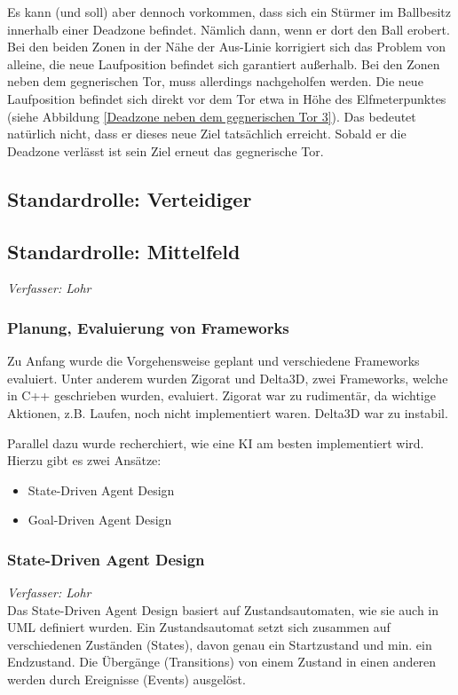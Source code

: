 \documentclass[fontsize=12pt,a4paper,final]{scrartcl}[2003/01/01]
\begin{document}
Es kann (und soll) aber dennoch vorkommen, dass sich ein Stürmer im Ballbesitz innerhalb einer Deadzone befindet. Nämlich dann, wenn er dort den Ball erobert. Bei den beiden Zonen in der Nähe der Aus-Linie korrigiert sich das Problem von alleine, die neue Laufposition befindet sich garantiert außerhalb. Bei den Zonen neben dem gegnerischen Tor, muss allerdings nachgeholfen werden. Die neue Laufposition befindet sich direkt vor dem Tor etwa in Höhe des Elfmeterpunktes (siehe Abbildung \ref{Deadzone neben dem gegnerischen Tor 3}). Das bedeutet natürlich nicht, dass er dieses neue Ziel tatsächlich erreicht. Sobald er die Deadzone verlässt ist sein Ziel erneut das gegnerische Tor.


\subsection{Standardrolle: Verteidiger}


\subsection{Standardrolle: Mittelfeld}
\textit{Verfasser: Lohr}\\
\subsubsection{Planung, Evaluierung von Frameworks}
Zu Anfang wurde die Vorgehensweise geplant und verschiedene Frameworks evaluiert. Unter anderem wurden Zigorat und Delta3D, zwei Frameworks, welche in C++ geschrieben wurden, evaluiert. Zigorat war zu rudimentär, da wichtige Aktionen, z.B. Laufen, noch nicht implementiert waren. Delta3D war zu instabil. \par
Parallel dazu wurde recherchiert, wie eine KI am besten implementiert wird. Hierzu gibt es zwei Ansätze:
\begin{itemize}
 \item State-Driven Agent Design
 \item Goal-Driven Agent Design
\end{itemize}

\subsubsection{State-Driven Agent Design}
\textit{Verfasser: Lohr}\\
Das State-Driven Agent Design basiert auf Zustandsautomaten, wie sie auch in UML definiert wurden. Ein Zustandsautomat setzt sich zusammen auf verschiedenen Zuständen (States), davon genau ein Startzustand und min. ein Endzustand. Die Übergänge (Transitions) von einem Zustand in einen anderen werden durch Ereignisse (Events) ausgelöst.
\end{document}
